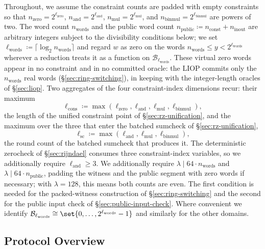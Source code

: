 \documentclass{article}
\theoremstyle{definition}
\newcommand{\BB}{\mathcal{B}}
\begin{document}
Throughout, we assume the constraint counts are padded with empty constraints so that $n_\text{zero} = 2^{\ell_\text{zero}}$, $n_\text{and} = 2^{\ell_\text{and}}$, $n_\text{mul} = 2^{\ell_\text{mul}}$, and $n_\text{binmul} = 2^{\ell_\text{binmul}}$ are powers of two. The word count $n_\text{words}$ and the public word count $n_\text{public} \coloneqq n_\text{const} + n_\text{inout}$ are arbitrary integers subject to the divisibility conditions below; we set $\ell_\text{words} \coloneqq \lceil \log_2 n_\text{words} \rceil$ and regard $w$ as zero on the words $n_\text{words} \le y < 2^{\ell_\text{words}}$ wherever a reduction treats it as a function on $\BB_{\ell_\text{words}}$. These virtual zero words appear in no constraint and in no committed oracle: the LIOP commits only the $n_\text{words}$ real words (\S\ref{sec:ring-switching}), in keeping with the integer-length oracles of \S\ref{sec:liop}. Two aggregates of the four constraint-index dimensions recur: their maximum
\[
  \ell_\text{cons} \coloneqq \max(\ell_\text{zero}, \ell_\text{and}, \ell_\text{mul}, \ell_\text{binmul}),
\]
the length of the unified constraint point of \S\ref{sec:rz-unification}, and the maximum over the three that enter the batched sumcheck of \S\ref{sec:rz-unification},
\[
  \ell_\text{sc} \coloneqq \max(\ell_\text{and}, \ell_\text{mul}, \ell_\text{binmul}),
\]
the round count of the batched sumcheck that produces it. The deterministic zerocheck of \S\ref{sec:rijndael} consumes three constraint-index variables, so we additionally require $\ell_\text{and} \geq 3$. We additionally require $\lambda \mid 64 \cdot n_\text{words}$ and $\lambda \mid 64 \cdot n_\text{public}$, padding the witness and the public segment with zero words if necessary; with $\lambda = 128$, this means both counts are even. The first condition is needed for the packed-witness construction of \S\ref{sec:ring-switching} and the second for the public input check of \S\ref{sec:public-input-check}. Where convenient we identify $\BB_{\ell_\text{words}} \cong \set{0, \ldots, 2^{\ell_\text{words}} - 1}$ and similarly for the other domains.

\subsection{Protocol Overview}
\label{sec:protocol-overview}
\end{document}
